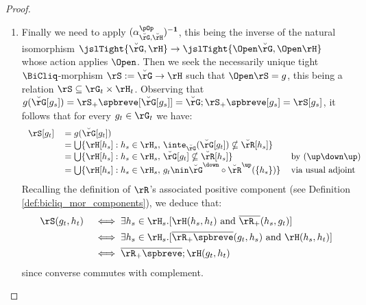 \documentclass{article}
\begin{document}
\begin{proof}
\begin{enumerate}
\item
Finally we need to apply $(\alpha_{\breve{\rG},\breve{\rH}}^{\pOp})^{\bf-1}$, this being the inverse of the natural isomorphism $\jslTight{\breve{\rG},\rH} \to \jslTight{\Open\breve{\rG},\Open\rH}$ whose action applies $\Open$. Then we seek the necessarily unique tight $\BiCliq$-morphism $\rS := \breve{\rG} \to \rH$ such that $\Open\rS = g$, this being a relation $\rS \subseteq \rG_t \times \rH_t$. Observing that $g(\breve{\rG}[g_s]) = \rS_+\spbreve[\breve{\rG}[g_s]] = \breve{\rG};\rS_+\spbreve[g_s] = \rS[g_s]$, it follows that for every $g_t \in \rG_t$ we have:
\[
\begin{tabular}{lll}
$\rS[g_t]$
&
$= g(\breve{\rG}[g_t])$
\\&
$= \bigcup \{ \rH[h_s] : h_s \in \rH_s, \, \inte_{\breve{\rG}}(\breve{\rG}[g_t]) \nsubseteq \breve{\rR}[h_s] \}$
\\&
$= \bigcup \{ \rH[h_s] : h_s \in \rH_s, \, \breve{\rG}[g_t] \nsubseteq \breve{\rR}[h_s] \}$
& by $(\up\down\up)$
\\&
$= \bigcup \{ \rH[h_s] : h_s \in \rH_s, \, g_t \nin \breve{\rG}^\down \circ \breve{\rR}^\up (\{h_s\}) \}$
& via usual adjoint
\end{tabular}
\]
Recalling the definition of $\rR$'s associated positive component (see Definition \ref{def:bicliq_mor_components}), we deduce that:
\[
\begin{tabular}{lll}
$\rS(g_t,h_t)$
&
$\iff \exists h_s \in \rH_s.[ \rH(h_s,h_t) \text{ and } \overline{\rR_+}(h_s,g_t) ]$
\\[1ex] &
$\iff \exists h_s \in \rH_s.[ \overline{\rR_+\spbreve}(g_t,h_s) \text{ and } \rH(h_s,h_t)]$
\\[1ex] &
$\iff \overline{\rR_+\spbreve} ; \rH(g_t,h_t)$
\end{tabular}
\]
since converse commutes with complement.
\end{enumerate}


\end{proof}
\end{document}
